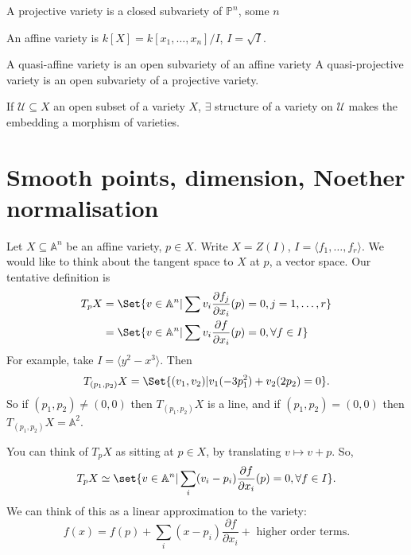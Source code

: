 \documentclass{article}
\newcommand{\A}{\mathbb{A}}
\newcommand{\proj}{\mathbb{P}}
\begin{document}
\begin{defi}
    A projective variety is a closed subvariety of $\proj^n$, some $n$
\end{defi}
An affine variety is $k[X] = k[x_1, \dotsc, x_n]/I$, $I = \sqrt{I}$.
\begin{defi}
    A quasi-affine variety is an open subvariety of an affine variety
    A quasi-projective variety is an open subvariety of a projective variety.
\end{defi}
\begin{ex}
    If $\mathcal{U} \subseteq X$ an open subset of a variety $X$, $\exists$ structure of a variety on $\mathcal{U}$ makes the embedding a morphism of varieties.
\end{ex}

\section{Smooth points, dimension, Noether normalisation}
Let $X \subseteq \A^n$ be an affine variety, $p \in X$. Write $X = Z(I)$, $I = \langle f_1, \dotsc, f_r \rangle$.
We would like to think about the tangent space to $X$ at $p$, a vector space.
Our tentative definition is
\begin{align*}
    T_p X &= \Set{v \in \A^n | \sum v_i \frac{\partial f_j}{\partial x_i}(p) = 0, j = 1,\dotsc, r} \\
    &= \Set{v \in \A^n | \sum v_i \frac{\partial f}{\partial x_i}(p) = 0, \forall f \in I}
\end{align*}
For example, take $I = \langle y^2 - x^3 \rangle$.
Then
\begin{equation*}
    T_{(p_1, p_2)} X = \Set{(v_1, v_2) | v_1 (-3p_1^2) + v_2 (2 p_2) = 0}.
\end{equation*}
So if $(p_1, p_2) \neq (0, 0)$ then $T_{(p_1, p_2)} X$ is a line, and if $(p_1, p_2) = (0, 0)$ then $T_{(p_1, p_2)} X = \A^2$.
\begin{remark}
    You can think of $T_p X$ as sitting at $p \in X$, by translating $v \mapsto v + p$.
    So,
    \begin{equation*}
        T_p X \simeq \set{v \in \A^n | \sum_i (v_i - p_i) \frac{\partial f}{\partial x_i} (p) = 0, \forall f \in I}.
    \end{equation*}
    We can think of this as a linear approximation to the variety:
    \begin{equation*}f(x) = f(p) + \sum_i (x - p_i) \frac{\partial f}{\partial x_i} + \text{ higher order terms}.\end{equation*}
\end{remark}
\end{document}
